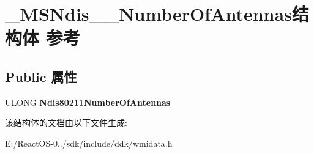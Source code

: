 \hypertarget{struct___m_s_ndis__80211___number_of_antennas}{}\section{\+\_\+\+M\+S\+Ndis\+\_\+\_\+\+Number\+Of\+Antennas结构体 参考}
\label{struct___m_s_ndis__80211___number_of_antennas}
\subsection*{Public 属性}
\begin{DoxyCompactItemize}
\item 
\mbox{\label{struct___m_s_ndis__80211___number_of_antennas_afacb99dae405a4f30ed51b0760f84a08}} 
U\+L\+O\+NG {\bfseries Ndis80211\+Number\+Of\+Antennas}
\end{DoxyCompactItemize}


该结构体的文档由以下文件生成\+:\begin{DoxyCompactItemize}
\item 
E\+:/\+React\+O\+S-\/0../sdk/include/ddk/wmidata.\+h\end{DoxyCompactItemize}
